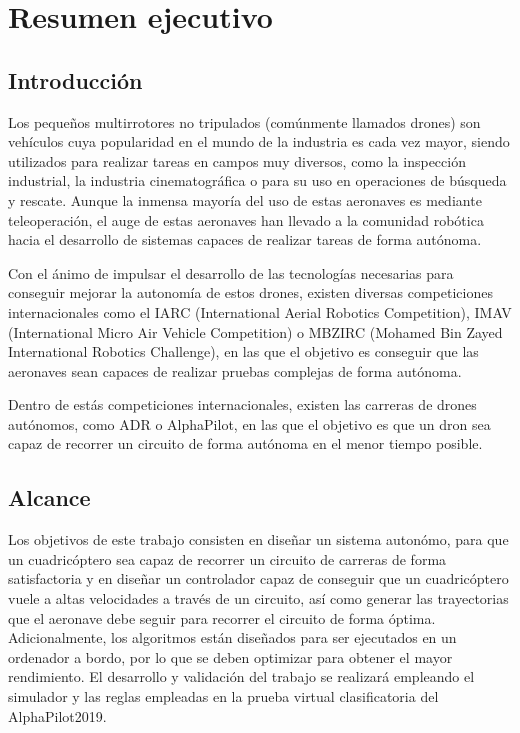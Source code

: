 \chapter*{Resumen ejecutivo}
\section*{Introducción}

Los pequeños multirrotores no tripulados (comúnmente llamados drones) son vehículos cuya popularidad en el mundo de la industria es cada vez mayor, siendo utilizados para realizar tareas en campos muy diversos, como la inspección industrial, la industria cinematográfica o para su uso en operaciones de búsqueda y rescate. Aunque la inmensa mayoría del uso de estas aeronaves es mediante teleoperación, el auge de estas aeronaves han llevado a la comunidad robótica hacia el desarrollo de sistemas capaces de realizar tareas de forma autónoma.

Con el ánimo de impulsar el desarrollo de las tecnologías necesarias para conseguir mejorar la autonomía de estos drones, existen diversas competiciones internacionales como el IARC (International Aerial Robotics Competition), IMAV (International Micro Air Vehicle Competition) o MBZIRC (Mohamed Bin Zayed International Robotics Challenge), en las que el objetivo es conseguir que las aeronaves sean capaces de realizar pruebas complejas de forma autónoma. 

Dentro de estás competiciones internacionales, existen las carreras de drones autónomos, como ADR o AlphaPilot, en las que el objetivo es que un dron sea capaz de recorrer un circuito de forma autónoma en el menor tiempo posible.

\section*{Alcance}
Los objetivos de este trabajo consisten en diseñar un sistema autonómo, para que un cuadricóptero sea capaz de recorrer un circuito de carreras de forma satisfactoria y en diseñar un controlador capaz de conseguir que un cuadricóptero vuele a altas velocidades a través de un circuito, así como generar las trayectorias que el aeronave debe seguir para recorrer el circuito de forma óptima. Adicionalmente, los algoritmos están diseñados para ser ejecutados en un ordenador a bordo, por lo que se deben optimizar para obtener el mayor rendimiento.
El desarrollo y validación del trabajo se realizará empleando el simulador y las reglas empleadas en la prueba virtual clasificatoria del AlphaPilot2019.

